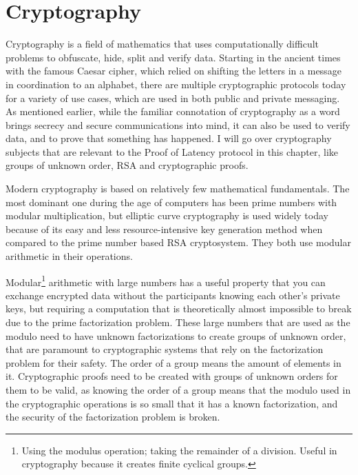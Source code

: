 \section{Cryptography}

Cryptography is a field of mathematics that uses computationally difficult problems to obfuscate, hide, split and verify data. Starting in the ancient times with the famous Caesar cipher, which relied on shifting the letters in a message in coordination to an alphabet, there are multiple cryptographic protocols today for a variety of use cases, which are used in both public and private messaging. As mentioned earlier, while the familiar connotation of cryptography as a word brings secrecy and secure communications into mind, it can also be used to verify data, and to prove that something has happened. I will go over cryptography subjects that are relevant to the Proof of Latency protocol in this chapter, like groups of unknown order, RSA and cryptographic proofs.

Modern cryptography is based on relatively few mathematical fundamentals. The most dominant one during the age of computers has been prime numbers with modular multiplication, but elliptic curve cryptography is used widely today because of its easy and less resource-intensive key generation method when compared to the prime number based RSA cryptosystem. They both use modular arithmetic in their operations.

Modular\footnote{Using the modulus operation; taking the remainder of a division. Useful in cryptography because it creates finite cyclical groups.} arithmetic with large numbers has a useful property that you can exchange encrypted data without the participants knowing each other's private keys, but requiring a computation that is theoretically almost impossible to break due to the prime factorization problem. These large numbers that are used as the modulo need to have unknown factorizations to create groups of unknown order, that are paramount to cryptographic systems that rely on the factorization problem for their safety. The order of a group means the amount of elements in it. Cryptographic proofs need to be created with groups of unknown orders for them to be valid, as knowing the order of a group means that the modulo used in the cryptographic operations is so small that it has a known factorization, and the security of the factorization problem is broken.

